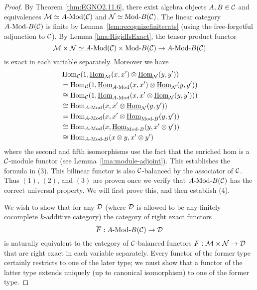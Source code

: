 \documentclass{amsart}
\begin{document}
\begin{proof}  
	 By Theorem \ref{thm:EGNO2.11.6}, there exist algebra objects $A, B \in \mathcal C$ and equivalences $\cM \simeq \Mod{A}{}(\cC)$ and $\cN \simeq \Mod{}{B}(\cC)$. The linear category $\Mod{A }{B}(\cC)$ is finite by Lemma~\ref{lem:recognizefinitecats} (using the free-forgetful adjunction to $\mathcal C$).
	 By Lemma \ref{lma:RigidIsExact}, the tensor product functor
	\begin{equation*}
		\cM \times \cN \simeq \Mod{A}{}(\cC) \times  \Mod{}{B}(\cC) \to \Mod{A}{B}(\cC)
	\end{equation*}
	is exact in each variable separately. Moreover we have
	\begin{align*}
		&\Hom_{\cC}(1, \IHom_{\cM}(x,x') \otimes \IHom_{\cN}(y, y')) \\
		& = \Hom_{\cC}(1, \IHom_{\Mod{A}{}}(x,x') \otimes \IHom_{\cN}(y, y')) \\
		&\cong \Hom_{\cC}(1, \IHom_{\Mod{A}{}}(x,x' \otimes \IHom_{\cN}(y, y')) ) \\
		& \cong \Hom_{\Mod{A}{}}(x, x' \otimes \IHom_{\cN}(y, y') ) \\
		& = \Hom_{\Mod{A}{}}(x, x' \otimes \IHom_{\Mod{}{B}}(y, y') )\\
		& \cong \Hom_{\Mod{A}{}}(x,  \IHom_{\Mod{}{B}}(y, x' \otimes y') )\\
		& \cong \Hom_{\Mod{A}{B}}(x \otimes y, x' \otimes y')
	\end{align*} 
where the second and fifth isomorphisms use the fact that the enriched hom is a $\mathcal C$-module functor (see Lemma~\ref{lma:module-adjoint}). This establishes the formula in (3). This bilinear functor is also $\mathcal C$-balanced by the associator of $\mathcal C$. Thus $(1)$, $(2)$, and $(3)$ are proven once we verify that $\Mod{A }{B}(\cC)$ has the correct universal property. We will first prove this, and then establish (4).  

We wish to show that for any $\mathcal D$ (where $\mathcal D$ is allowed to be any finitely cocomplete $k$-additive category) the category of right exact functors 
\begin{equation*}
	\overline{F}:\Mod{A}{B}(\cC) \to \cD
\end{equation*}
	is naturally equivalent to the category of $\mathcal C$-balanced functors $F:\mathcal M \times \mathcal N \to \mathcal D$ that are right exact in each variable separately. Every functor of the former type certainly restricts to one of the later type; we must show that a functor of the latter type extends uniquely (up to canonical isomorphism) to one of the former type. 
	

\end{proof}
\end{document}
